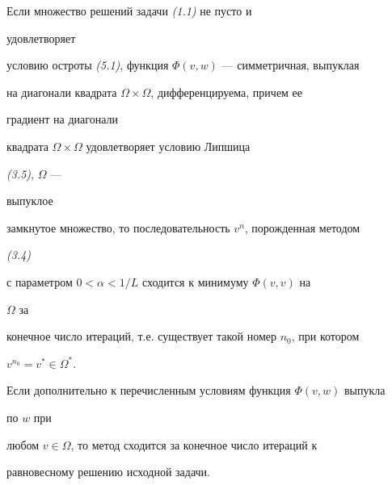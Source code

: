 \begin{thm} Если множество решений задачи {\em (1.1)} не пусто и


удовлетворяет


условию остроты {\em (5.1)}, функция $\Phi(v,w)$ --- симметричная, выпуклая


на диагонали квадрата $\Omega\times\Omega$, дифференцируема, причем ее


градиент на диагонали


квадрата $\Omega\times\Omega$ удовлетворяет условию Липшица


{\em (3.5)}, $\Omega$ ---


выпуклое


замкнутое множество, то последовательность $v^n$, порожденная методом


{\em (3.4)}


с параметром $0<\alpha<1/L$ сходится к минимуму $\Phi(v,v)$ на


$\Omega$ за


конечное число итераций, т.е. существует такой номер $n_0$, при котором


$v^{n_0}=v^*\in\Omega^*$.





Если дополнительно к перечисленным условиям функция $\Phi(v,w)$ выпукла


по $w$ при


любом $v\in\Omega$, то метод сходится за конечное число итераций к


равновесному решению исходной задачи.


\end{thm}





